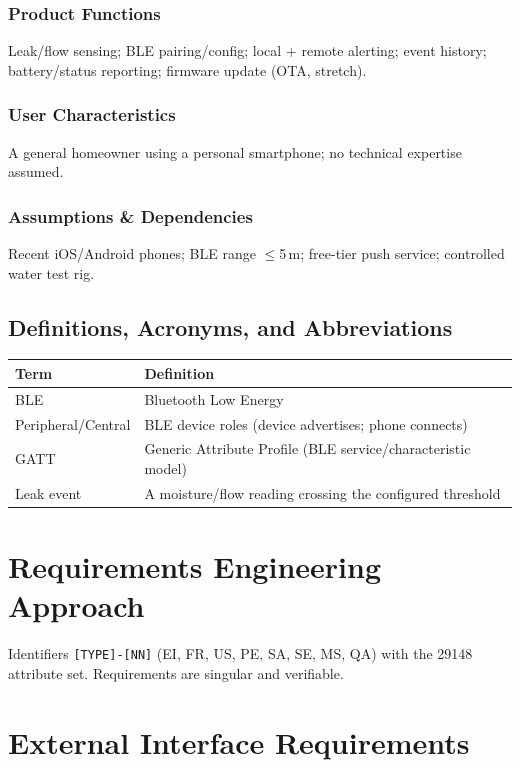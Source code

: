 \documentclass[11pt,letterpaper]{article}
\begin{document}
\subsubsection{Product Functions}
Leak/flow sensing; BLE pairing/config; local + remote alerting; event history;
battery/status reporting; firmware update (OTA, stretch).
\subsubsection{User Characteristics}
A general homeowner using a personal smartphone; no technical expertise assumed.
\subsubsection{Assumptions \& Dependencies}
Recent iOS/Android phones; BLE range $\leq$5\,m; free-tier push service; controlled
water test rig.
\subsection{Definitions, Acronyms, and Abbreviations}
\begin{table}[H]\begin{center}\begin{tabular}{ | p{3cm} | p{10cm} |}\hline
\textbf{Term} & \textbf{Definition} \\ \hline
BLE & Bluetooth Low Energy \\ \hline
Peripheral/Central & BLE device roles (device advertises; phone connects) \\ \hline
GATT & Generic Attribute Profile (BLE service/characteristic model) \\ \hline
Leak event & A moisture/flow reading crossing the configured threshold \\ \hline
\end{tabular}\end{center}\end{table}
\newpage

\section{Requirements Engineering Approach}
Identifiers \texttt{[TYPE]-[NN]} (EI, FR, US, PE, SA, SE, MS, QA) with the 29148
attribute set. Requirements are singular and verifiable.
\newpage

\section{External Interface Requirements}
\end{document}
